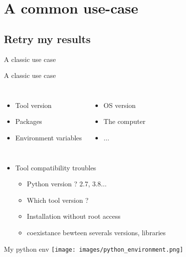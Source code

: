 \section{A common use-case}
\subsection{Retry my results}

\begin{frame}{A classic use case}
\end{frame}
\begin{frame}{A classic use case}
\begin{columns}
\begin{itemize}
	\item Tool version
	\item Packages
	\item Environment variables
\end{itemize}
\begin{itemize}
	\item OS version
	\item The computer 
	\item ...
\end{itemize}
\end{columns}
\end{frame}

\begin{frame}
\begin{itemize}
\item Tool compatibility troubles
	\begin{itemize}
	\item Python version ? 2.7, 3.8...
	\item Which tool version ?
	\item Installation without root access
	\item coexistance bewteen severals versions, libraries
	\end{itemize}
\end{itemize}
\end{frame}

\begin{frame}{My python env}
\centering\texttt{[image: images/python\_environment.png]} 
\end{frame}

